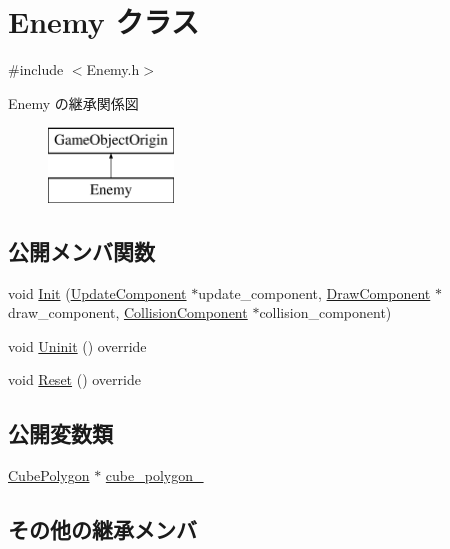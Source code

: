\hypertarget{class_enemy}{}\section{Enemy クラス}
\label{class_enemy}


{\ttfamily \#include $<$Enemy.\+h$>$}

Enemy の継承関係図\begin{figure}[H]
\begin{center}
\leavevmode
\includegraphics[height=2.000000cm]{class_enemy}
\end{center}
\end{figure}
\subsection*{公開メンバ関数}
\begin{DoxyCompactItemize}
\item 
void \mbox{\hyperlink{class_enemy_abd6d8dea6f50de0809ef2bd639ec97fe}{Init}} (\mbox{\hyperlink{class_update_component}{Update\+Component}} $\ast$update\+\_\+component, \mbox{\hyperlink{class_draw_component}{Draw\+Component}} $\ast$draw\+\_\+component, \mbox{\hyperlink{class_collision_component}{Collision\+Component}} $\ast$collision\+\_\+component)
\item 
void \mbox{\hyperlink{class_enemy_a9aeaa757abdf0c37fd67c4ce5aed6962}{Uninit}} () override
\item 
void \mbox{\hyperlink{class_enemy_ab86571061e7fcabcf8c646b1abad5581}{Reset}} () override
\end{DoxyCompactItemize}
\subsection*{公開変数類}
\begin{DoxyCompactItemize}
\item 
\mbox{\hyperlink{class_cube_polygon}{Cube\+Polygon}} $\ast$ \mbox{\hyperlink{class_enemy_a9a24b765d76b789cc678701886570511}{cube\+\_\+polygon\+\_\+}}
\end{DoxyCompactItemize}
\subsection*{その他の継承メンバ}


